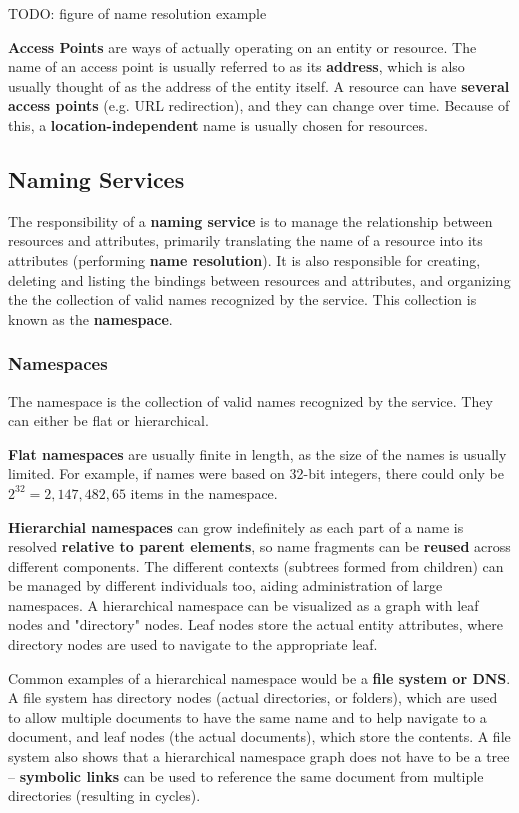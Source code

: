 \documentclass{article}
\begin{document}
TODO: figure of name resolution example

\textbf{Access Points} are ways of actually operating on an entity or resource. The name of an access point is usually referred to as its \textbf{address}, which is also usually thought of as the address of the entity itself. A resource can have \textbf{several access points} (e.g. URL redirection), and they can change over time. Because of this, a \textbf{location-independent} name is usually chosen for resources.

\subsection{Naming Services}

The responsibility of a \textbf{naming service} is to manage the relationship between resources and attributes, primarily translating the name of a resource into its attributes (performing \textbf{name resolution}). It is also responsible for creating, deleting and listing the bindings between resources and attributes, and organizing the the collection of valid names recognized by the service. This collection is known as the \textbf{namespace}.

\subsubsection{Namespaces}

The namespace is the collection of valid names recognized by the service. They can either be flat or hierarchical. 

\textbf{Flat namespaces} are usually finite in length, as the size of the names is usually limited. For example, if names were based on 32-bit integers, there could only be $2^{32} = 2,147,482,65$ items in the namespace. 

\textbf{Hierarchial namespaces} can grow indefinitely as each part of a name is resolved \textbf{relative to parent elements}, so name fragments can be \textbf{reused} across different components. The different contexts (subtrees formed from children) can be managed by different individuals too, aiding administration of large namespaces. A hierarchical namespace can be visualized as a graph with leaf nodes and "directory" nodes. Leaf nodes store the actual entity attributes, where directory nodes are used to navigate to the appropriate leaf.

Common examples of a hierarchical namespace would be a \textbf{file system or DNS}. A file system has directory nodes (actual directories, or folders), which are used to allow multiple documents to have the same name and to help navigate to a document, and leaf nodes (the actual documents), which store the contents. A file system also shows that a hierarchical namespace graph does not have to be a tree -- \textbf{symbolic links} can be used to reference the same document from multiple directories (resulting in cycles).
\end{document}
